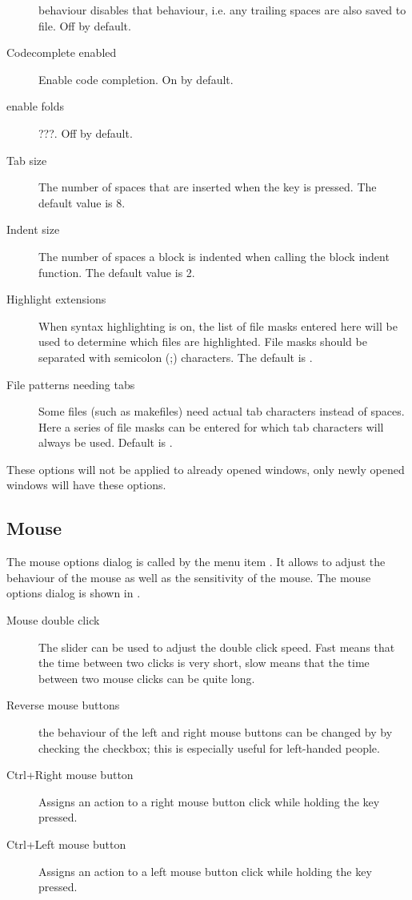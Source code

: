 \begin{description}
behaviour disables that behaviour, i.e. any trailing spaces are also saved
to file. Off by default.
\item[Codecomplete enabled]
Enable code completion. On by default.
\item[enable folds]
???. Off by default.
\item[Tab size]
The number of spaces that are inserted when the  key is pressed.
The default value is 8.
\item[Indent size]
The number of spaces a block is indented when calling the block indent function.
The default value is 2.
\item[Highlight extensions]
When syntax highlighting is on, the list of file masks entered here will be
used to determine which files are highlighted. File masks should be
separated with semicolon (;) characters. The default is
.
\item[File patterns needing tabs]
Some files (such as makefiles) need actual tab characters instead of spaces. 
Here a series of file masks can be entered for which tab characters will
always be used. Default is .
\end{description}
\begin{remark}
These options will not be applied to already opened windows, only newly
opened windows will have these options.
\end{remark}
%
%
\subsection{Mouse}
\label{se:prefmouse}
The mouse options dialog is called by the menu item
. It allows to adjust the behaviour of the
mouse as well as the sensitivity of the mouse.
The mouse options dialog is shown in .


\begin{description}
\item[Mouse double click]
The slider can be used to adjust the double click speed. Fast means that the
time between two clicks is very short, slow means that the time between two
mouse clicks can be quite long.
\item[Reverse mouse buttons]
the behaviour of the left and right mouse buttons can be changed by
by checking the checkbox; this is especially useful for left-handed people.
\item[Ctrl+Right mouse button]
Assigns an action to a right mouse button click while holding the 
 key pressed.
\item[Ctrl+Left mouse button]
Assigns an action to a left mouse button click while holding the 
 key pressed.
\end{description}

